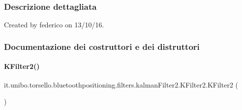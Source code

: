 \subsubsection{Descrizione dettagliata}
Created by federico on 13/10/16. 

\subsubsection{Documentazione dei costruttori e dei distruttori}
\hypertarget{classit_1_1unibo_1_1torsello_1_1bluetoothpositioning_1_1filters_1_1kalmanFilter2_1_1KFilter2_a7b8d897944a753c29b80361daf3d62b5_a7b8d897944a753c29b80361daf3d62b5}{}\label{classit_1_1unibo_1_1torsello_1_1bluetoothpositioning_1_1filters_1_1kalmanFilter2_1_1KFilter2_a7b8d897944a753c29b80361daf3d62b5_a7b8d897944a753c29b80361daf3d62b5} 
\paragraph{\texorpdfstring{K\+Filter2()}{KFilter2()}}
{\footnotesize\ttfamily it.\+unibo.\+torsello.\+bluetoothpositioning.\+filters.\+kalman\+Filter2.\+K\+Filter2.\+K\+Filter2 (\begin{DoxyParamCaption}{ }\end{DoxyParamCaption})}


